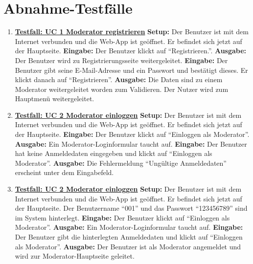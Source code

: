\section{Abnahme-Testfälle}
\begin{enumerate}
	\item \underline{\textbf{Testfall: UC 1 Moderator registrieren}} \linebreak
	\textbf{Setup:} Der Benutzer ist mit dem Internet verbunden und die Web-App ist geöffnet. Er befindet sich jetzt auf der Hauptseite.\linebreak
	\textbf{Eingabe:} Der Benutzer klickt auf ``Registrieren.''.\linebreak
	\textbf{Ausgabe:} Der Benutzer wird zu Registrierungsseite weitergeleitet.\linebreak
	\textbf{Eingabe:} Der Benutzer gibt seine E-Mail-Adresse und ein Passwort und bestätigt dieses. Er klickt danach auf ``Registrieren''. \linebreak
	\textbf{Ausgabe:} Die Daten sind zu einem Moderator weitergeleitet worden zum Validieren. Der Nutzer wird zum Hauptmenü weitergeleitet.
	
	\item \underline{\textbf{Testfall: UC 2 Moderator einloggen}} \linebreak
	\textbf{Setup:} Der Benutzer ist mit dem Internet verbunden und die Web-App ist geöffnet. Er befindet sich jetzt auf der Hauptseite. \linebreak
	\textbf{Eingabe:} Der Benutzer klickt auf ``Einloggen als Moderator''. \linebreak
	\textbf{Ausgabe:} Ein Moderator-Loginformular taucht auf.\linebreak
	\textbf{Eingabe:} Der Benutzer hat keine Anmeldedaten eingegeben und klickt auf ``Einloggen als Moderator''.\linebreak
	\textbf{Ausgabe:} Die Fehlermeldung ``Ungültige Anmeldedaten'' erscheint unter dem Eingabefeld.
	
	\item \underline{\textbf{Testfall: UC 2 Moderator einloggen}} \linebreak
	\textbf{Setup:} Der Benutzer ist mit dem Internet verbunden und die Web-App ist geöffnet. Er befindet sich jetzt auf der Hauptseite. Der Benutzername ``001'' und das Passwort ``123456789'' sind im System hinterlegt. \linebreak
	\textbf{Eingabe:} Der Benutzer klickt auf ``Einloggen als Moderator''. \linebreak
	\textbf{Ausgabe:} Ein Moderator-Loginformular taucht auf.\linebreak
	\textbf{Eingabe:} Der Benutzer gibt die hinterlegten Anmeldedaten und klickt auf ``Einloggen als Moderator''.\linebreak
	\textbf{Ausgabe:} Der Benutzer ist als Moderator angemeldet und wird zur Moderator-Hauptseite geleitet.
	

\end{enumerate}
